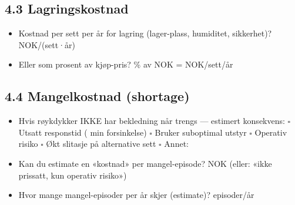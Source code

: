 \documentclass[12pt, a4paper, norsk]{article}
\begin{document}
\subsection*{4.3 Lagringskostnad}

\vspace{0.3cm}

\begin{itemize}
\item[\textbf{Q:}] Kostnad per sett per år for lagring (lager-plass, humiditet, sikkerhet)?
  \newline\underline{\hspace{6cm}} NOK/(sett·år)

\item[\textbf{Q:}] Eller som prosent av kjøp-pris?
  \newline\underline{\hspace{2cm}} \% av \underline{\hspace{3cm}} NOK = \underline{\hspace{2cm}} NOK/sett/år
\end{itemize}

\subsection*{4.4 Mangelkostnad (shortage)}

\vspace{0.3cm}

\begin{itemize}
\item[\textbf{Q:}] Hvis røykdykker IKKE har bekledning når trengs — estimert konsekvens:
  \newline $\square$ Utsatt responstid (\underline{\hspace{3cm}} min forsinkelse)
  \newline $\square$ Bruker suboptimal utstyr
  \newline $\square$ Operativ risiko
  \newline $\square$ Økt slitasje på alternative sett
  \newline $\square$ Annet: \underline{\hspace{6cm}}

\item[\textbf{Q:}] Kan du estimate en «kostnad» per mangel-episode?
  \newline\underline{\hspace{6cm}} NOK (eller: «ikke prissatt, kun operativ risiko»)

\item[\textbf{Q:}] Hvor mange mangel-episoder per år skjer (estimate)?
  \newline\underline{\hspace{6cm}} episoder/år
\end{itemize}
\end{document}
